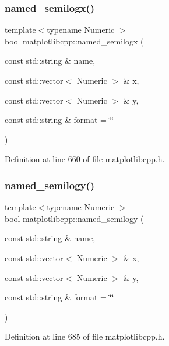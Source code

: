 \subsubsection{\texorpdfstring{named\_semilogx()}{named\_semilogx()}}
{\footnotesize\ttfamily template$<$typename Numeric $>$ \\
bool matplotlibcpp\+::named\+\_\+semilogx (\begin{DoxyParamCaption}\item[{const std\+::string \&}]{name,  }\item[{const std\+::vector$<$ Numeric $>$ \&}]{x,  }\item[{const std\+::vector$<$ Numeric $>$ \&}]{y,  }\item[{const std\+::string \&}]{format = {\ttfamily \char`\"{}\char`\"{}} }\end{DoxyParamCaption})}



Definition at line 660 of file matplotlibcpp.\+h.

\mbox{\label{namespacematplotlibcpp_a34ff51e2a6f94ea30b4ead714f480c4f}} 
\subsubsection{\texorpdfstring{named\_semilogy()}{named\_semilogy()}}
{\footnotesize\ttfamily template$<$typename Numeric $>$ \\
bool matplotlibcpp\+::named\+\_\+semilogy (\begin{DoxyParamCaption}\item[{const std\+::string \&}]{name,  }\item[{const std\+::vector$<$ Numeric $>$ \&}]{x,  }\item[{const std\+::vector$<$ Numeric $>$ \&}]{y,  }\item[{const std\+::string \&}]{format = {\ttfamily \char`\"{}\char`\"{}} }\end{DoxyParamCaption})}



Definition at line 685 of file matplotlibcpp.\+h.

\mbox{\label{namespacematplotlibcpp_aa5bc4092c9e2acbb2c6ec4efd024cf2f}} 
